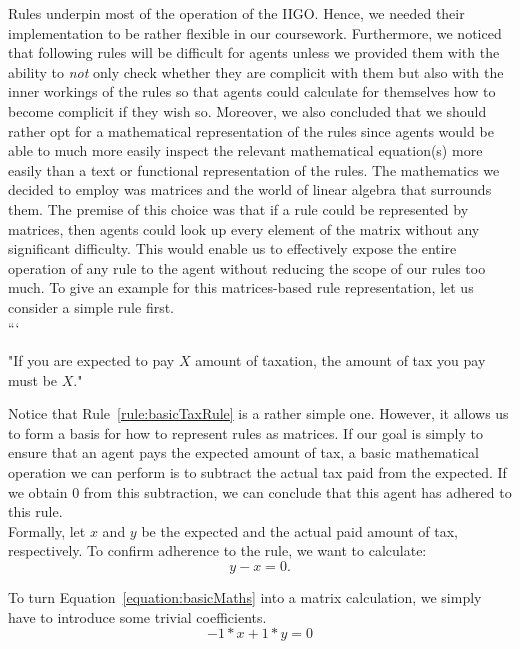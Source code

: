 Rules underpin most of the operation of the IIGO. Hence, we needed their implementation to be rather flexible in our coursework.
Furthermore, we noticed that following rules will be difficult for agents unless we provided them with the ability to \emph{not} only check whether they are complicit with them but also with the inner workings of the rules so that agents could calculate for themselves how to become complicit if they wish so.
Moreover, we also concluded that we should rather opt for a mathematical representation of the rules since agents would be able to much more easily inspect the relevant mathematical equation(s) more easily than a text or functional representation of the rules.
The mathematics we decided to employ was matrices and the world of linear algebra that surrounds them.
\linebreak
The premise of this choice was that if a rule could be represented by matrices, then agents could look up every element of the matrix without any significant difficulty. This would enable us to effectively expose the entire operation of any rule to the agent without reducing the scope of our rules too much.
To give an example for this matrices-based rule representation, let us consider a simple rule first. \\ ```
\begin{rule_IIGO}
    "If you are expected to pay $X$ amount of taxation, the amount of tax you pay must be $X$."
\label{rule:basicTaxRule}
\end{rule_IIGO}
\par
Notice that Rule~\ref{rule:basicTaxRule} is a rather simple one. However, it allows us to form a basis for how to represent rules as matrices.
If our goal is simply to ensure that an agent pays the expected amount of tax, a basic mathematical operation we can perform is to subtract the actual tax paid from the expected.
If we obtain $0$ from this subtraction, we can conclude that this agent has adhered to this rule. \\
Formally, let $x$ and $y$ be the expected and the actual paid amount of tax, respectively. To confirm adherence to the rule, we want to calculate:
\begin{equation}
    y - x = 0 . 
    \label{equation:basicMaths}
\end{equation}

To turn Equation~\eqref{equation:basicMaths} into a matrix calculation, we simply have to introduce some trivial coefficients.
\begin{equation}
    -1*x +
       1*y = 0
       \label{equation:coefLinear}
\end{equation}
      
